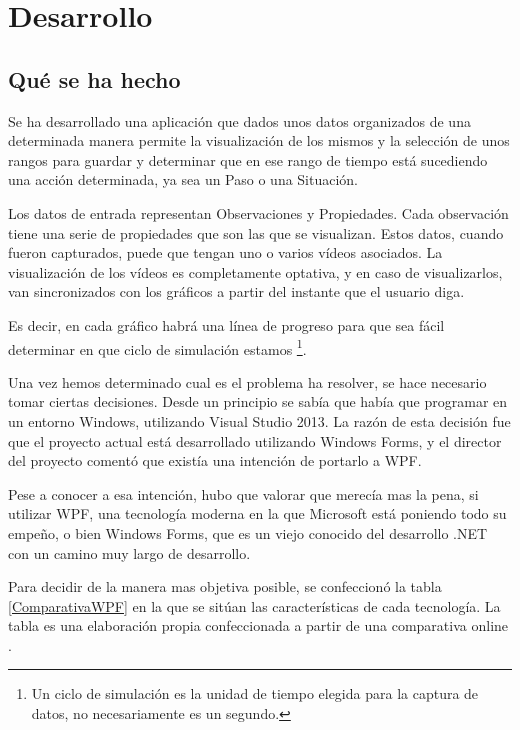 \chapter{Desarrollo}

\section{Qu\'{e} se ha hecho}
Se ha desarrollado una aplicaci\'{o}n que dados unos datos organizados
de una determinada manera permite la visualizaci\'{o}n de los mismos y
la selecci\'{o}n de unos rangos para guardar y determinar que en ese rango de tiempo
est\'{a} sucediendo una acci\'{o}n determinada, ya sea un Paso o una Situaci\'on.

Los datos de entrada representan Observaciones y Propiedades. Cada observaci\'{o}n tiene una serie
de propiedades que son las que se visualizan. Estos datos, cuando fueron capturados, puede
que tengan uno o varios v\'{i}deos asociados. La visualizaci\'{o}n de los v\'{i}deos es completamente
optativa, y en caso de visualizarlos, van sincronizados con los gr\'{a}ficos a partir del instante que el 
usuario diga.

Es decir, en cada gr\'{a}fico habr\'{a} una l\'{i}nea de progreso para que sea f\'{a}cil determinar en que ciclo
de simulaci\'{o}n estamos \footnote{Un ciclo de simulaci\'{o}n es la unidad de tiempo elegida para la captura de datos, no
    necesariamente es un segundo.}.

Una vez hemos determinado cual es el problema ha resolver, se hace necesario tomar ciertas decisiones.
Desde un principio se sab\'ia que hab\'ia que programar en un entorno Windows, utilizando Visual Studio 2013.
La raz\'on de esta decisi\'on fue que el proyecto actual est\'a desarrollado utilizando Windows Forms, y el 
director del proyecto coment\'o que exist\'ia una intenci\'on de portarlo a WPF.

Pese a conocer a esa intenci\'on, hubo que valorar que merec\'ia mas la pena, si utilizar WPF, una tecnolog\'ia moderna
en la que Microsoft est\'a poniendo todo su empe\~no, o bien Windows Forms, que es un viejo conocido del desarrollo
.NET con un camino muy largo de desarrollo.

Para decidir de la manera mas objetiva posible, se confeccion\'o la tabla \ref{ComparativaWPF} en la que se sit\'uan 
las caracter\'isticas de cada tecnolog\'ia. La tabla es una elaboraci\'on propia confeccionada a partir de una comparativa
online \cite{WPFvsWinForms:Comparative}.

